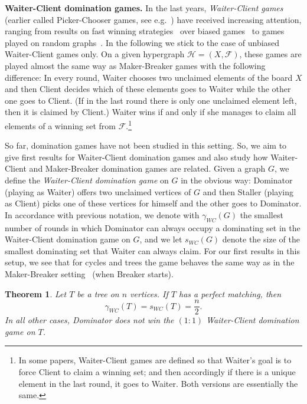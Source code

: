 \documentclass[reqno, 12pt]{amsart}
\numberwithin{equation}{section}
\numberwithin{figure}{section}
\newtheorem{theorem}{Theorem}
\newcommand{\calH}{\mathcal{H}}
\newcommand{\calF}{\mathcal{F}}
\begin{document}
\textbf{Waiter-Client domination games.}
In the last years, \textit{Waiter-Client games} (earlier called Picker-Chooser games, see e.g.~\cite{beck2008combinatorial}) have received increasing attention, ranging from results on fast winning strategies~\cite{clemens2020fast,dvovrak2021waiter} 
over biased games~\cite{bednarska2016manipulative,hefetzCW,nenadov2023probabilistic} to games played on random graphs~\cite{clemens2021waiter,hefetz2017waiter}. 
In the following we stick to the case of unbiased Waiter-Client games only. On a given hypergraph $\calH = (X,\calF)$, these games are played almost
the same way as Maker-Breaker games with the following difference: In every round, Waiter chooses two unclaimed elements of the board $X$ and then Client decides which 
of these elements goes to Waiter while the other one goes to Client. (If in the last round there is only
one unclaimed element left, then it is claimed by Client.) 
Waiter wins if and only if she manages to claim all 
elements of a winning set from $\calF$.\footnote{In some papers,
Waiter-Client games are defined so that Waiter's goal is to force Client to claim a winning set; and then accordingly if there is a unique element in the last round, it goes to Waiter. Both versions are essentially the same.}

So far, domination games have not been studied in this setting. So, we aim to give first results for Waiter-Client domination games and also study how Waiter-Client and Maker-Breaker domination games are related.
Given a graph $G$, we define the \textit{Waiter-Client domination game} on $G$ in the obvious way: Dominator (playing as Waiter) offers two unclaimed vertices of $G$ and then 
Staller (playing as Client) picks one of these vertices for himself and the other goes to Dominator.
In accordance with previous notation,
we denote with 
$\gamma_{WC}(G)$
the smallest number of rounds in which
Dominator can always occupy a dominating set
in the Waiter-Client domination game on $G$,
and we let $s_{WC}(G)$ denote the size of the smallest
dominating set that Waiter can always claim.
For our first results in this setup,
we see that for cycles and trees
the game behaves the same way
as in the Maker-Breaker setting~\cite{gledel2019maker} (when Breaker starts).

\begin{theorem}\label{thm:WC.trees}
Let $T$ be a tree on $n$ vertices.
If $T$ has a perfect matching, then
$$\gamma_{WC}(T) = s_{WC}(T) = \frac{n}{2} .$$
In all other cases, Dominator does not win the $(1:1)$
Waiter-Client domination game on $T$.
\end{theorem}
\end{document}
